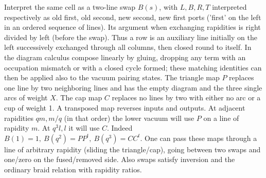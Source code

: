 \documentclass[11pt]{article}
\numberwithin{equation}{section}
\theoremstyle{definition}\newtheorem{definition}[theorem]{Definition}
\theoremstyle{remark}\newtheorem{remark}[theorem]{Remark}
\begin{document}
Interpret the same cell as a two-line swap \(B(s)\), with \(L,B,R,T\) interpreted respectively as old first, old second, new second, new first ports ('first' on the left in an ordered sequence of lines). Its argument when exchanging rapidities is right divided by left (before the swap). Thus a row is an auxiliary line initially on the left successively exchanged through all columns, then closed round to itself. In the diagram calculus compose linearly by gluing, dropping any term with an occupation mismatch or with a closed cycle formed; these matching identities can then be applied also to the vacuum pairing states. The triangle map \(P\) replaces one line by two neighboring lines and has the empty diagram and the three single arcs of weight \(X\). The cap map \(C\) replaces no lines by two with either no arc or a cup of weight 1. A transposed map reverses inputs and outputs. At adjacent rapidities \(q m,m/q\) (in that order) the lower vacuum will use \(P\) on a line of rapidity \(m\). At \(q^3 l,l\) it will use \(C\). Indeed \(B(1)=1,\ B(q^2)=P P^t,\ B(q^3)=CC^t\). One can pass these maps through a line of arbitrary rapidity (sliding the triangle/cap), going between two swaps and one/zero on the fused/removed side. Also swaps satisfy inversion and the ordinary braid relation with rapidity ratios.
\end{document}
